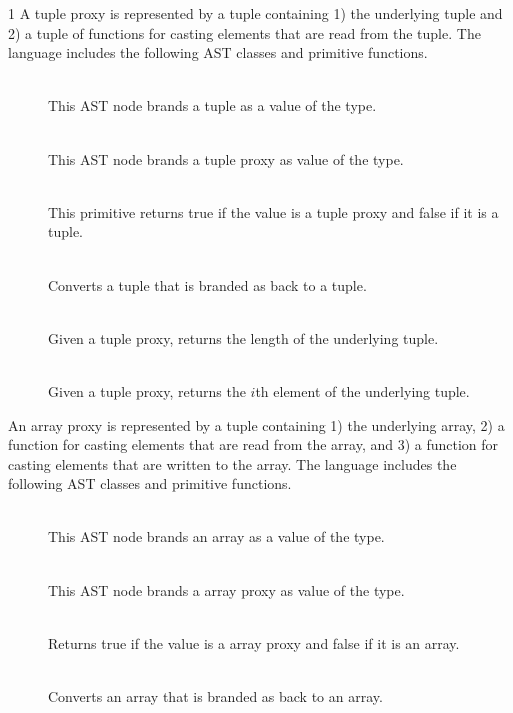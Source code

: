 \documentclass[7x10]{TimesAPriori_MIT}%
\def\pythonEd{1}
\def\edition{1}
\newcommand{\pythonColor}[0]{}
\numberwithin{theorem}{chapter}
\numberwithin{definition}{chapter}
\numberwithin{equation}{chapter}
\begin{document}
{\if\edition\pythonEd\pythonColor
%
A tuple proxy is represented by a tuple containing 1) the underlying
tuple and 2) a tuple of functions for casting elements that are read
from the tuple. The \LangPVec{} language includes the following AST
classes and primitive functions.

\begin{description}
\item[] \ \\
%
  This AST node brands a tuple as a value of the \PTUPLETYNAME{} type.
\item[]\ \\
%
  This AST node brands a tuple proxy as value of the \PTUPLETYNAME{} type.
\item[]\ \\
%
  This primitive returns true if the value is a tuple proxy and false
  if it is a tuple.
\item[]\ \\
%
  Converts a tuple that is branded as \PTUPLETYNAME{}
  back to a tuple.
  
\item[]\ \\
%
  Given a tuple proxy, returns the length of the underlying tuple.
  
\item[]\ \\
%
  Given a tuple proxy, returns the $i$th element of the underlying
  tuple.
  
\end{description}

An array proxy is represented by a tuple containing 1) the underlying
array, 2) a function for casting elements that are read from the
array, and 3) a function for casting elements that are written to the
array.  The \LangPVec{} language includes the following AST classes
and primitive functions.

\begin{description}
\item[]\ \\
  This AST node brands an array as a value of the \PARRAYTYNAME{} type.

\item[]\ \\
%
  This AST node brands a array proxy as value of the \PARRAYTYNAME{} type.
\item[]\ \\
%
  Returns true if the value is a array proxy and false if it is an
  array.
\item[]\ \\
%
  Converts an array that is branded as \PARRAYTYNAME{} back to an
  array.
  

\end{description}}
\end{document}
